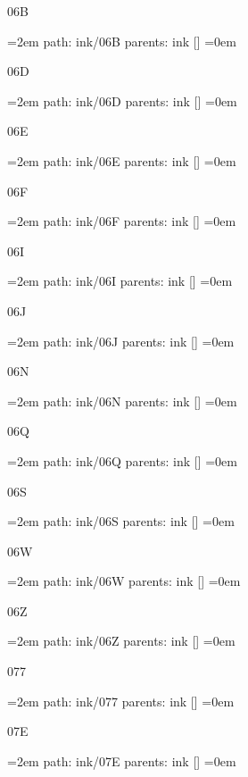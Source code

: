 06B
\smallskip
\par\begingroup
\leftskip=2em
path: ink/06B
\smallskip
parents:  ink []
\smallskip
\leftskip=0em
\par\endgroup
\bigskip
{}
06D
\smallskip
\par\begingroup
\leftskip=2em
path: ink/06D
\smallskip
parents:  ink []
\smallskip
\leftskip=0em
\par\endgroup
\bigskip
{}
06E
\smallskip
\par\begingroup
\leftskip=2em
path: ink/06E
\smallskip
parents:  ink []
\smallskip
\leftskip=0em
\par\endgroup
\bigskip
{}
06F
\smallskip
\par\begingroup
\leftskip=2em
path: ink/06F
\smallskip
parents:  ink []
\smallskip
\leftskip=0em
\par\endgroup
\bigskip
{}
06I
\smallskip
\par\begingroup
\leftskip=2em
path: ink/06I
\smallskip
parents:  ink []
\smallskip
\leftskip=0em
\par\endgroup
\bigskip
{}
06J
\smallskip
\par\begingroup
\leftskip=2em
path: ink/06J
\smallskip
parents:  ink []
\smallskip
\leftskip=0em
\par\endgroup
\bigskip
{}
06N
\smallskip
\par\begingroup
\leftskip=2em
path: ink/06N
\smallskip
parents:  ink []
\smallskip
\leftskip=0em
\par\endgroup
\bigskip
{}
06Q
\smallskip
\par\begingroup
\leftskip=2em
path: ink/06Q
\smallskip
parents:  ink []
\smallskip
\leftskip=0em
\par\endgroup
\bigskip
{}
06S
\smallskip
\par\begingroup
\leftskip=2em
path: ink/06S
\smallskip
parents:  ink []
\smallskip
\leftskip=0em
\par\endgroup
\bigskip
{}
06W
\smallskip
\par\begingroup
\leftskip=2em
path: ink/06W
\smallskip
parents:  ink []
\smallskip
\leftskip=0em
\par\endgroup
\bigskip
{}
06Z
\smallskip
\par\begingroup
\leftskip=2em
path: ink/06Z
\smallskip
parents:  ink []
\smallskip
\leftskip=0em
\par\endgroup
\bigskip
{}
077
\smallskip
\par\begingroup
\leftskip=2em
path: ink/077
\smallskip
parents:  ink []
\smallskip
\leftskip=0em
\par\endgroup
\bigskip
{}
07E
\smallskip
\par\begingroup
\leftskip=2em
path: ink/07E
\smallskip
parents:  ink []
\smallskip
\leftskip=0em
\par\endgroup
\bigskip
\bye
